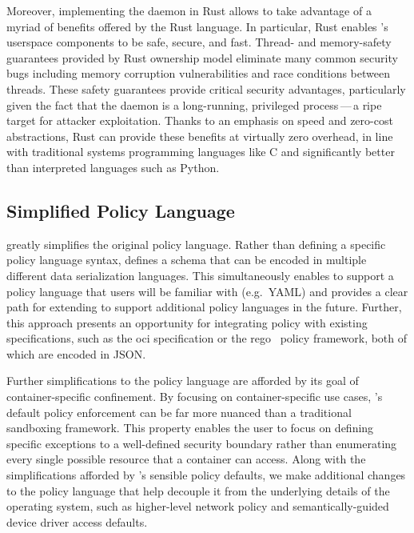 Moreover, implementing the \bpfcontain{} daemon in Rust allows \bpfcontain{} to take
advantage of a myriad of benefits offered by the Rust language. In particular, Rust
enables \bpfcontain{}'s userspace components to be safe, secure, and fast. Thread- and
memory-safety guarantees provided by Rust ownership model eliminate many common security
bugs including memory corruption vulnerabilities and race conditions between threads.
These safety guarantees provide critical security advantages, particularly given the fact
that the \bpfcontain{} daemon is a long-running, privileged process\,---\,a ripe target
for attacker exploitation. Thanks to an emphasis on speed and zero-cost abstractions, Rust
can provide these benefits at virtually zero overhead, in line with traditional systems
programming languages like C and significantly better than interpreted languages such as
Python.

\subsection{Simplified Policy Language}%
\label{ss:bpfcontain-simplified}

\bpfcontain{} greatly simplifies the original \bpfbox{} policy language. Rather than
defining a specific policy language syntax, \bpfcontain{} defines a schema that can be
encoded in multiple different data serialization languages.  This simultaneously enables
\bpfcontain{} to support a policy language that users will be familiar with (e.g.~YAML)
and provides a clear path for extending \bpfcontain{} to support additional policy
languages in the future. Further, this approach presents an opportunity for integrating
\bpfcontain{} policy with existing specifications, such as the \gls{oci} specification or
the rego~ policy framework, both of which are encoded in JSON\@.

Further simplifications to the \bpfcontain{} policy language are afforded by its goal of
container-specific confinement. By focusing on container-specific use cases,
\bpfcontain{}'s default policy enforcement can be far more nuanced than a traditional
sandboxing framework. This property enables the user to focus on defining specific
exceptions to a well-defined security boundary rather than enumerating every single
possible resource that a container can access. Along with the simplifications afforded by
\bpfcontain{}'s sensible policy defaults, we make additional changes to the policy
language that help decouple it from the underlying details of the operating system, such
as higher-level network policy and semantically-guided device driver access defaults.

